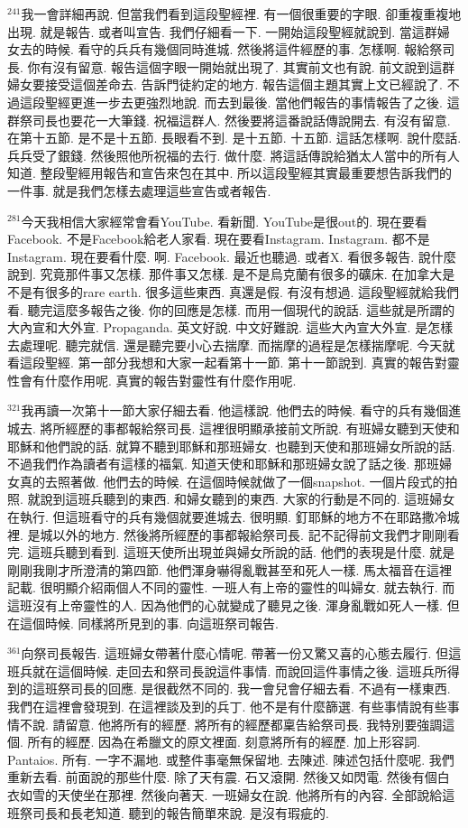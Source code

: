 \documentclass{book}
\begin{document}
$^{241}$我一會詳細再說.
但當我們看到這段聖經裡.
有一個很重要的字眼.
卻重複重複地出現.
就是報告.
或者叫宣告.
我們仔細看一下.
一開始這段聖經就說到.
當這群婦女去的時候.
看守的兵兵有幾個同時進城.
然後將這件經歷的事.
怎樣啊.
報給祭司長.
你有沒有留意.
報告這個字眼一開始就出現了.
其實前文也有說.
前文說到這群婦女要接受這個差命去.
告訴門徒約定的地方.
報告這個主題其實上文已經說了.
不過這段聖經更進一步去更強烈地說.
而去到最後.
當他們報告的事情報告了之後.
這群祭司長也要花一大筆錢.
祝福這群人.
然後要將這番說話傳說開去.
有沒有留意.
在第十五節.
是不是十五節.
長眼看不到.
是十五節.
十五節.
這話怎樣啊.
說什麼話.
兵兵受了銀錢.
然後照他所祝福的去行.
做什麼.
將這話傳說給猶太人當中的所有人知道.
整段聖經用報告和宣告來包在其中.
所以這段聖經其實最重要想告訴我們的一件事.
就是我們怎樣去處理這些宣告或者報告.

$^{281}$今天我相信大家經常會看YouTube.
看新聞.
YouTube是很out的.
現在要看Facebook.
不是Facebook給老人家看.
現在要看Instagram.
Instagram.
都不是Instagram.
現在要看什麼.
啊.
Facebook.
最近也聽過.
或者X.
看很多報告.
說什麼說到.
究竟那件事又怎樣.
那件事又怎樣.
是不是烏克蘭有很多的礦床.
在加拿大是不是有很多的rare earth.
很多這些東西.
真還是假.
有沒有想過.
這段聖經就給我們看.
聽完這麼多報告之後.
你的回應是怎樣.
而用一個現代的說話.
這些就是所謂的大內宣和大外宣.
Propaganda.
英文好說.
中文好難說.
這些大內宣大外宣.
是怎樣去處理呢.
聽完就信.
還是聽完要小心去揣摩.
而揣摩的過程是怎樣揣摩呢.
今天就看這段聖經.
第一部分我想和大家一起看第十一節.
第十一節說到.
真實的報告對靈性會有什麼作用呢.
真實的報告對靈性有什麼作用呢.

$^{321}$我再讀一次第十一節大家仔細去看.
他這樣說.
他們去的時候.
看守的兵有幾個進城去.
將所經歷的事都報給祭司長.
這裡很明顯承接前文所說.
有班婦女聽到天使和耶穌和他們說的話.
就算不聽到耶穌和那班婦女.
也聽到天使和那班婦女所說的話.
不過我們作為讀者有這樣的福氣.
知道天使和耶穌和那班婦女說了話之後.
那班婦女真的去照著做.
他們去的時候.
在這個時候就做了一個snapshot.
一個片段式的拍照.
就說到這班兵聽到的東西.
和婦女聽到的東西.
大家的行動是不同的.
這班婦女在執行.
但這班看守的兵有幾個就要進城去.
很明顯.
釘耶穌的地方不在耶路撒冷城裡.
是城以外的地方.
然後將所經歷的事都報給祭司長.
記不記得前文我們才剛剛看完.
這班兵聽到看到.
這班天使所出現並與婦女所說的話.
他們的表現是什麼.
就是剛剛我剛才所澄清的第四節.
他們渾身嚇得亂戰甚至和死人一樣.
馬太福音在這裡記載.
很明顯介紹兩個人不同的靈性.
一班人有上帝的靈性的叫婦女.
就去執行.
而這班沒有上帝靈性的人.
因為他們的心就變成了聽見之後.
渾身亂戰如死人一樣.
但在這個時候.
同樣將所見到的事.
向這班祭司報告.

$^{361}$向祭司長報告.
這班婦女帶著什麼心情呢.
帶著一份又驚又喜的心態去履行.
但這班兵就在這個時候.
走回去和祭司長說這件事情.
而說回這件事情之後.
這班兵所得到的這班祭司長的回應.
是很截然不同的.
我一會兒會仔細去看.
不過有一樣東西.
我們在這裡會發現到.
在這裡談及到的兵丁.
他不是有什麼篩選.
有些事情說有些事情不說.
請留意.
他將所有的經歷.
將所有的經歷都稟告給祭司長.
我特別要強調這個.
所有的經歷.
因為在希臘文的原文裡面.
刻意將所有的經歷.
加上形容詞.
Pantaios.
所有.
一字不漏地.
或整件事毫無保留地.
去陳述.
陳述包括什麼呢.
我們重新去看.
前面說的那些什麼.
除了天有震.
石又滾開.
然後又如閃電.
然後有個白衣如雪的天使坐在那裡.
然後向著天.
一班婦女在說.
他將所有的內容.
全部說給這班祭司長和長老知道.
聽到的報告簡單來說.
是沒有瑕疵的.
\end{document}
